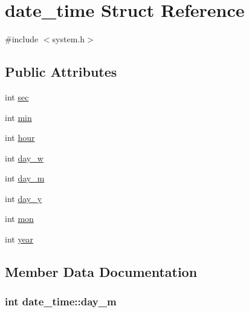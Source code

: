 \hypertarget{structdate__time}{}\section{date\+\_\+time Struct Reference}
\label{structdate__time}


{\ttfamily \#include $<$system.\+h$>$}

\subsection*{Public Attributes}
\begin{DoxyCompactItemize}
\item 
int \hyperlink{structdate__time_ac43a109ccc7f3c46840afa8a30dc51f1}{sec}
\item 
int \hyperlink{structdate__time_af93fdd2e01117a0171a2583718166d2a}{min}
\item 
int \hyperlink{structdate__time_a4331b46df7b89763a85ea97a246c4ee2}{hour}
\item 
int \hyperlink{structdate__time_aa021771ff83fe860afaaf158932fcb15}{day\+\_\+w}
\item 
int \hyperlink{structdate__time_a72ee4f3a6a9970e58861c868bc676ba2}{day\+\_\+m}
\item 
int \hyperlink{structdate__time_ad89b6054376708a35bc1c0a186c808ca}{day\+\_\+y}
\item 
int \hyperlink{structdate__time_a6e8a5baa74a619330ba9925cf0baf250}{mon}
\item 
int \hyperlink{structdate__time_ae96e2e4cc09780eaac04038e12bbe06b}{year}
\end{DoxyCompactItemize}


\subsection{Member Data Documentation}
\hypertarget{structdate__time_a72ee4f3a6a9970e58861c868bc676ba2}{}
\subsubsection[{day\+\_\+m}]{\setlength{\rightskip}{0pt plus 5cm}int date\+\_\+time\+::day\+\_\+m}\label{structdate__time_a72ee4f3a6a9970e58861c868bc676ba2}
\hypertarget{structdate__time_aa021771ff83fe860afaaf158932fcb15}{}
